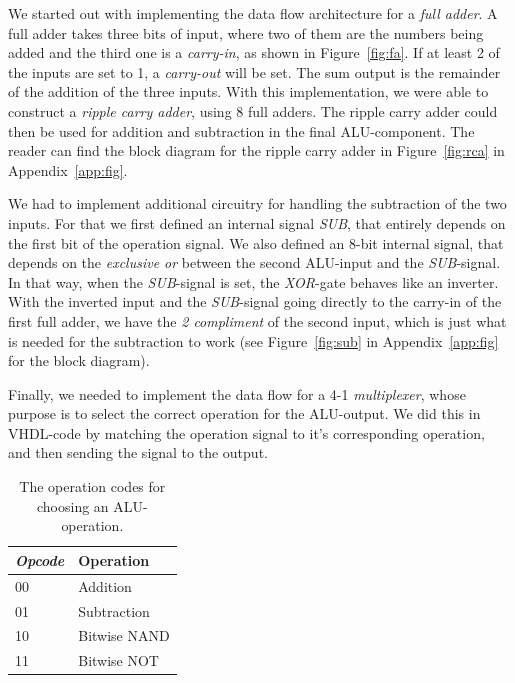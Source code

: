 \documentclass[a4,11pt]{article}
\begin{document}
We started out with implementing the data flow architecture for a {\it full adder}. A full adder
takes three bits of input, where two of them are the numbers being added and the third one is a
{\it carry-in}, as shown in Figure~\ref{fig:fa}. If at least 2 of the inputs are set to 1, a
{\it carry-out} will be set. The sum output is the remainder of the addition of the three inputs.
With this implementation, we were able to construct a {\it ripple carry adder}, using 8 full adders.
The ripple carry adder could then be used for addition and subtraction in the final ALU-component.
The reader can find the block diagram for the ripple carry adder in Figure~\ref{fig:rca} in
Appendix~\ref{app:fig}.

We had to implement additional circuitry for handling the subtraction of the two inputs. For
that we first defined an internal signal {\it SUB}, that entirely depends on the first bit of the
operation signal. We also defined an 8-bit internal signal, that depends on the {\it exclusive
or} between the second ALU-input and the {\it SUB}-signal. In that way, when the {\it SUB}-signal
is set, the {\it XOR}-gate behaves like an inverter. With the inverted input and the {\it SUB}-signal
going directly to the carry-in of the first full adder, we have the {\it 2 compliment} of the second
input, which is just what is needed for the subtraction to work (see Figure~\ref{fig:sub} in
Appendix~\ref{app:fig} for the block diagram).

Finally, we needed to implement the data flow for a 4-1 {\it multiplexer}, whose purpose is to
select the correct operation for the ALU-output. We did this in VHDL-code by matching the operation
signal to it's corresponding operation, and then sending the signal to the output.

\begin{table}   
	\centering
	\small
	\def\arraystretch{1.1}              
	\begin{tabular}{|l|l|}
		\hline
		{\it Opcode}    & {\bf Operation} \\ \hline
		00              & Addition        \\ 
		01              & Subtraction     \\
		10              & Bitwise NAND    \\ 
		11              & Bitwise NOT     \\ \hline
	\end{tabular}
	\caption{The operation codes for choosing an ALU-operation.}
	\label{tab:op}
\end{table}
\end{document}

